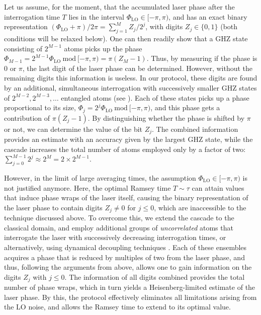 Let us assume, for the moment, that the accumulated laser phase after the
interrogation time $T$ lies in the interval $\Phi_\mathrm{LO}\in[-\pi,\pi)$, and
has an exact binary representation $(\Phi_\mathrm{LO}+\pi)/2\pi= \sum_{j=1}^M Z_j/
2^{j}$, with digits $Z_j\in \{0,1\}$ (both conditions will be relaxed below).
One can then readily show that a GHZ state consisting of $2^{M-1}$ atoms picks
up the phase $\Phi_{M-1} = 2^{M-1} \Phi_\mathrm{LO}  ~\mathrm{mod}~ [-\pi,\pi) = \pi
(Z_M-1)$. Thus, by measuring if the phase is $0$ or $\pi$, the last digit of the
laser phase can be determined. However, without
the remaining digits this information is
useless.
In our protocol, these digits are found by an additional, simultaneous
interrogation with successively smaller GHZ states of $2^{M-2},2^{M-3},\hdots$
entangled atoms (see ). Each of these states
picks up a phase proportional to its size,  $\Phi_{j} = 2^{j}
\Phi_\mathrm{LO}~\mathrm{mod}~ [-\pi,\pi)$, and this
phase gets a contribution of $\pi (Z_j-1)$.
By distinguishing whether the phase is shifted by $\pi$ or not, we can 
determine the value of the bit $Z_j$.
The combined information provides an estimate with an accuracy given by the
largest GHZ state, while the cascade increases the total number of atoms
employed only by a factor of two: $\sum_{j=0}^{M-1} 2^j \approx
2^{M}=2\times2^{M-1}$.

However, in the limit of large averaging times, the assumption
$\Phi_\mathrm{LO}\in [-\pi,\pi)$ is not justified anymore. Here, the optimal
Ramsey time $T\sim\tau$ can attain values that induce phase wraps of the laser
itself, causing the binary representation of the laser phase to contain digits
$Z_j\neq0$ for $j\leq0$, which are inaccessible to the technique discussed
above.
To overcome this, we extend the cascade to
the classical domain, and employ additional groups of {\it uncorrelated}
atoms that interrogate the laser with successively decreasing interrogation times, or
alternatively, using dynamical decoupling techniques \cite{Rosenband2013,
Borregaard2013,ddc}. Each of these ensembles acquires a phase that is
reduced by multiples of two from the laser phase, and thus, following the
arguments from above, allows one to gain information on the digits
$Z_j$ with $j\leq0$.
The information of all digits combined provides the total number of phase wraps,
which in turn yields a Heisenberg-limited estimate of the laser phase.
By this, the protocol effectively eliminates all limitations
arising from the LO noise, and allows the Ramsey time to extend to its optimal
value.

